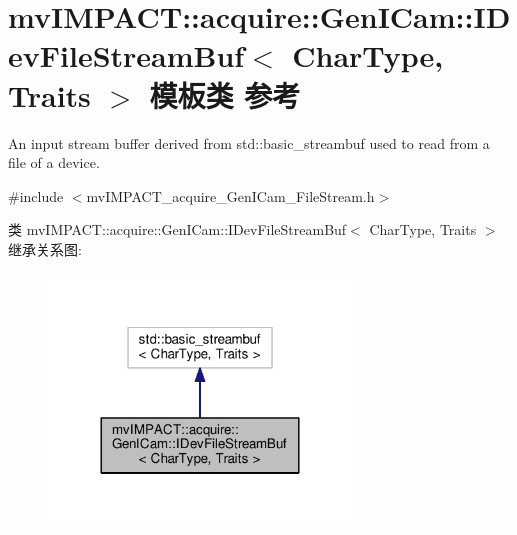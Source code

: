 \hypertarget{classmv_i_m_p_a_c_t_1_1acquire_1_1_gen_i_cam_1_1_i_dev_file_stream_buf}{\section{mv\+I\+M\+P\+A\+C\+T\+:\+:acquire\+:\+:Gen\+I\+Cam\+:\+:I\+Dev\+File\+Stream\+Buf$<$ Char\+Type, Traits $>$ 模板类 参考}
\label{classmv_i_m_p_a_c_t_1_1acquire_1_1_gen_i_cam_1_1_i_dev_file_stream_buf}
}


An input stream buffer derived from std\+::basic\+\_\+streambuf used to read from a file of a device.  




{\ttfamily \#include $<$mv\+I\+M\+P\+A\+C\+T\+\_\+acquire\+\_\+\+Gen\+I\+Cam\+\_\+\+File\+Stream.\+h$>$}



类 mv\+I\+M\+P\+A\+C\+T\+:\+:acquire\+:\+:Gen\+I\+Cam\+:\+:I\+Dev\+File\+Stream\+Buf$<$ Char\+Type, Traits $>$ 继承关系图\+:
\nopagebreak
\begin{figure}[H]
\begin{center}
\leavevmode
\includegraphics[width=228pt]{classmv_i_m_p_a_c_t_1_1acquire_1_1_gen_i_cam_1_1_i_dev_file_stream_buf__inherit__graph}
\end{center}
\end{figure}


